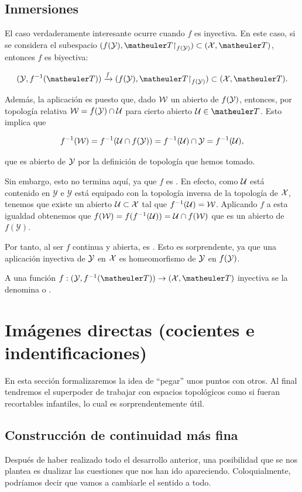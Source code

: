 \subsection{Inmersiones}
El caso verdaderamente interesante ocurre cuando $f$ es inyectiva. En este caso, si se considera el subespacio $(f(\mathcal{\Y}),\T\restriction_{f(\mathcal{\Y})}) \subset (\mathcal{\X},\T)$, entonces $f$ es biyectiva:

\[(\mathcal{\Y},f^{-1}(\T)) \xrightarrow{f} (f(\mathcal{\Y}),\T\restriction_{f(\mathcal{\Y})}) \subset (\mathcal{\X},\T).\]

Además, la aplicación es  puesto que, dado $\mathcal{W}$ un abierto de $f(\mathcal{\mathcal{Y}})$, entonces, por topología relativa $\mathcal{W}=f(\mathcal{Y})\cap \mathcal{U}$ para cierto abierto $\U\in \T$. Esto implica que

\[f^{-1}(\mathcal{W})=f^{-1}(\mathcal{U}\cap f(\mathcal{\mathcal{Y}}))=f^{-1}(\mathcal{U})\cap \mathcal{\mathcal{Y}}=f^{-1}(\mathcal{U}),\]

que es abierto de $\mathcal{\mathcal{Y}}$ por la definición de topología que hemos tomado.

Sin embargo, esto no termina aquí, ya que $f$ es . En efecto, como $\mathcal{U}$ está contenido en $\mathcal{Y}$ e $\mathcal{Y}$ está equipado con la topología inversa de la topología de $\mathcal{X}$, tenemos que existe un abierto $\mathcal{U} \subset \mathcal{X}$ tal que $f^{-1}(\mathcal{U}) = \mathcal{W}$. Aplicando $f$ a esta igualdad obtenemos que $f(\mathcal{W}) = f(f^{-1}(\mathcal{U})) = \mathcal{U} \cap f(\mathcal{W})$ que es un abierto de $f(\mathcal{Y})$.

Por tanto, al ser $f$ continua y abierta, es . Esto es sorprendente, ya que una aplicación inyectiva de $\mathcal{\mathcal{Y}}$ en $\mathcal{\mathcal{X}}$ es homeomorfismo de $\mathcal{\mathcal{Y}}$ en $f(\mathcal{\mathcal{Y}})$.

\begin{defi}
	A una función $f:(\Y,f^{-1}(\T))\to(\X,\T)$ inyectiva se la denomina  o .
\end{defi}
\section{Imágenes directas (cocientes e indentificaciones)}
En esta sección formalizaremos la idea de ``pegar'' unos puntos con otros. Al final tendremos el superpoder de trabajar con espacios topológicos como si fueran recortables infantiles, lo cual es sorprendentemente útil.
\subsection{Construcción de continuidad más fina}
Después de haber realizado todo el desarrollo anterior, una posibilidad que se nos plantea es dualizar las cuestiones que nos han ido apareciendo. Coloquialmente, podríamos decir que vamos a cambiarle el sentido a todo.

